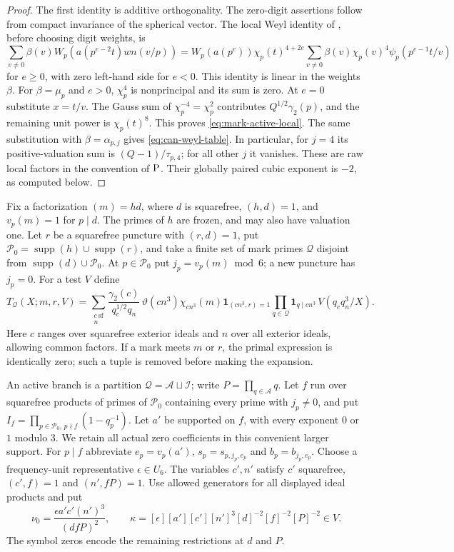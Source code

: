 \documentclass[11pt,a4paper]{article}
\numberwithin{equation}{section}
\theoremstyle{definition}
\theoremstyle{remark}
\newcommand{\Psrc}{\textup{P}}
\newcommand{\ind}{\mathbf 1}
\begin{document}
\begin{proof}
The first identity is additive orthogonality.  The zero-digit assertions
follow from compact invariance of the spherical vector.  The local Weyl
identity of \cite[Lemma 6.2]{P}, before choosing digit weights, is
\[
 \sum_{v\ne0}\beta(v)W_p(a(p^{e-2}t)wn(v/p))
 =W_p(a(p^e))\chi_p(t)^{4+2e}
       \sum_{v\ne0}\beta(v)\chi_p(v)^4\psi_p(p^{e-1}t/v)
\]
for $e\ge0$, with zero left-hand side for $e<0$.  This identity is
linear in the weights $\beta$.  For $\beta=\mu_p$ and $e>0$,
$\chi_p^4$ is nonprincipal and its sum is zero.  At $e=0$ substitute
$x=t/v$.  The Gauss sum of $\chi_p^{-4}=\chi_p^2$ contributes
$Q^{1/2}\gamma_2(p)$, and the remaining unit power is $\chi_p(t)^8$.
This proves \eqref{eq:mark-active-local}.  The same substitution with
$\beta=\alpha_{p,j}$ gives \eqref{eq:can-weyl-table}.  In particular,
for $j=4$ its positive-valuation sum is $(Q-1)/\tau_{p,4}$; for all
other $j$ it vanishes.  These are raw local factors in the convention
of $\Psrc$.  Their globally paired cubic exponent is $-2$, as computed below.
\end{proof}

Fix a factorization $(m)=h d$, where $d$ is squarefree,
$(h,d)=1$, and $v_p(m)=1$ for $p\mid d$.
The primes of $h$ are frozen, and may also have valuation one.
Let $r$ be a squarefree puncture with $(r,d)=1$, put
$\mathcal P_0=\operatorname{supp}(h)\cup\operatorname{supp}(r)$,
and take a finite set of mark primes $\mathcal Q$ disjoint from
$\operatorname{supp}(d)\cup\mathcal P_0$.
At $p\in\mathcal P_0$ put $j_p=v_p(m)\bmod6$; a new puncture has
$j_p=0$.  For a test $V$ define
\begin{equation}\label{eq:marked-primal-exact}
 T_{\mathcal Q}(X;m,r,V)=
 \sum_{\substack{c\ \mathrm{sf}\\n}}
 \frac{\gamma_2(c)}{q_c^{1/2}q_n}\,
 \vartheta(cn^3)\chi_{cn^3}(m)\ind_{(cn^3,r)=1}
 \prod_{q\in\mathcal Q}\ind_{q\mid cn^3}\,
 V(q_cq_n^3/X).
\end{equation}
Here $c$ ranges over squarefree exterior ideals and $n$ over all
exterior ideals, allowing common factors.
If a mark meets $m$ or $r$, the primal expression is identically zero;
such a tuple is removed before making the expansion.

An active branch is a partition $\mathcal Q=\mathcal A\sqcup\mathcal I$;
write $P=\prod_{q\in\mathcal A}q$.
Let $f$ run over squarefree products of primes of $\mathcal P_0$
containing every prime with $j_p\ne0$, and put
$ I_f=\prod_{p\in\mathcal P_0,\,p\nmid f}(1-q_p^{-1})$.
Let $a'$ be supported on $f$, with every exponent $0$ or $1$ modulo $3$.
We retain all actual zero coefficients in this convenient larger support.
For $p\mid f$ abbreviate
$e_p=v_p(a')$, $s_p=s_{p,j_p,e_p}$ and $b_p=b_{j_p,e_p}$.
Choose a frequency-unit representative $\epsilon\in U_6$.
The variables $c',n'$ satisfy $c'$ squarefree,
$(c',f)=1$ and $(n',fP)=1$.
Use allowed generators for all displayed ideal products and put
\begin{equation}\label{eq:marked-frequency}
 \nu_0=\frac{\epsilon a'c'(n')^3}{(dfP)^2},\qquad
 \kappa=[\epsilon][a'][c'][n']^3[d]^{-2}[f]^{-2}[P]^{-2}\in V.
\end{equation}
The symbol zeros encode the remaining restrictions at $d$ and $P$.
\end{document}
